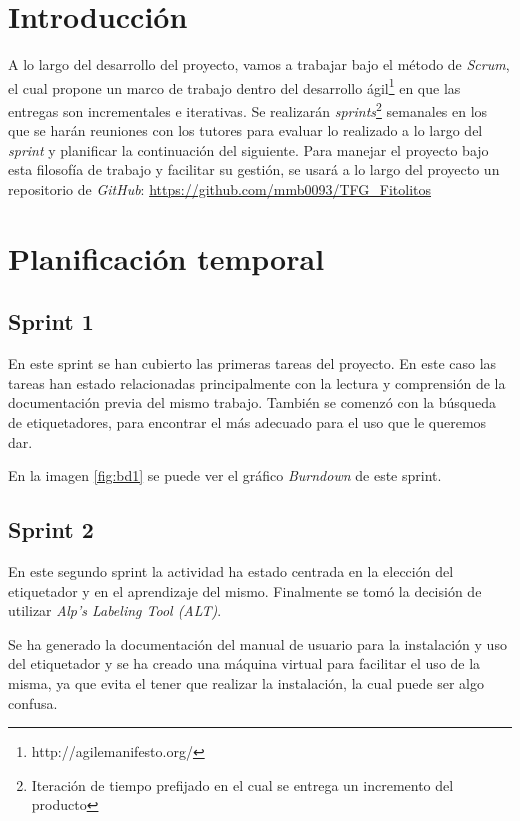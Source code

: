 
\section{Introducción}
A lo largo del desarrollo del proyecto, vamos a trabajar bajo el método de \textit{Scrum}, el cual propone un marco de trabajo dentro del desarrollo ágil\footnote{http://agilemanifesto.org/} en que las entregas son incrementales e iterativas. Se realizarán \textit{sprints}\footnote{Iteración de tiempo prefijado en el cual se entrega un incremento del producto} semanales en los que se harán reuniones con los tutores para evaluar lo realizado a lo largo del \textit{sprint} y planificar la continuación del siguiente.
Para manejar el proyecto bajo esta filosofía de trabajo y facilitar su gestión, se usará a lo largo del proyecto un repositorio de \textit{GitHub}: \url{https://github.com/mmb0093/TFG_Fitolitos}

\section{Planificación temporal}
\subsection{Sprint 1}
En este sprint se han cubierto las primeras tareas del proyecto. En este caso las tareas han estado relacionadas principalmente con la lectura y comprensión de la documentación previa del mismo trabajo.
También se comenzó con la búsqueda de etiquetadores, para encontrar el más adecuado para el uso que le queremos dar.


En la imagen \ref{fig:bd1} se puede ver el gráfico \textit{Burndown}  de este sprint.

\subsection{Sprint 2}
En este segundo sprint la actividad ha estado centrada en la elección del etiquetador y en el aprendizaje del mismo. Finalmente se tomó la decisión de utilizar \textit{Alp’s Labeling Tool (ALT)}. 

Se ha generado la documentación del manual de usuario para la instalación y uso del etiquetador y se ha creado una máquina virtual para facilitar el uso de la misma, ya que evita el tener que realizar la instalación, la cual puede ser algo confusa.

